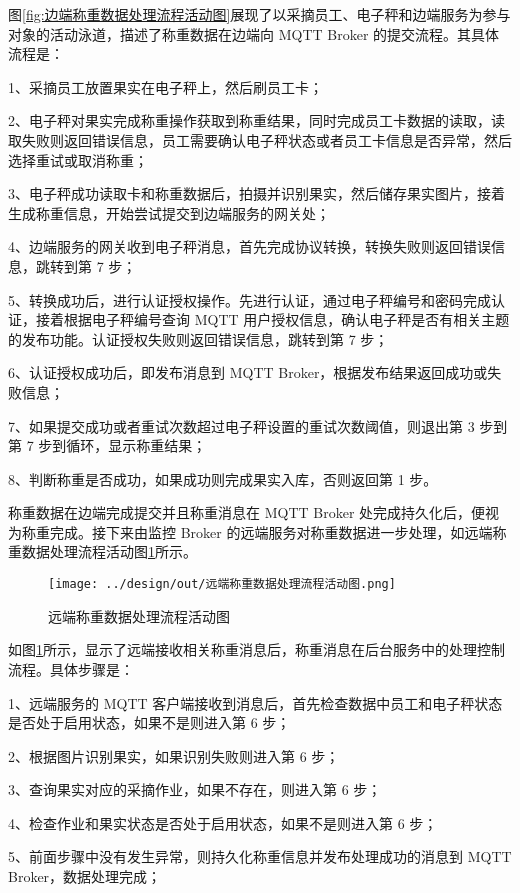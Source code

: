 图\ref{fig:边端称重数据处理流程活动图}展现了以采摘员工、电子秤和边端服务为参与对象的活动泳道，描述了称重数据在边端向 MQTT Broker 的提交流程。其具体流程是：

1、采摘员工放置果实在电子秤上，然后刷员工卡；

2、电子秤对果实完成称重操作获取到称重结果，同时完成员工卡数据的读取，读取失败则返回错误信息，员工需要确认电子秤状态或者员工卡信息是否异常，然后选择重试或取消称重；

3、电子秤成功读取卡和称重数据后，拍摄并识别果实，然后储存果实图片，接着生成称重信息，开始尝试提交到边端服务的网关处；

4、边端服务的网关收到电子秤消息，首先完成协议转换，转换失败则返回错误信息，跳转到第 7 步；

5、转换成功后，进行认证授权操作。先进行认证，通过电子秤编号和密码完成认证，接着根据电子秤编号查询 MQTT 用户授权信息，确认电子秤是否有相关主题的发布功能。认证授权失败则返回错误信息，跳转到第 7 步；

6、认证授权成功后，即发布消息到 MQTT Broker，根据发布结果返回成功或失败信息；

7、如果提交成功或者重试次数超过电子秤设置的重试次数阈值，则退出第 3 步到第 7 步到循环，显示称重结果；

8、判断称重是否成功，如果成功则完成果实入库，否则返回第 1 步。

称重数据在边端完成提交并且称重消息在 MQTT Broker 处完成持久化后，便视为称重完成。接下来由监控 Broker 的远端服务对称重数据进一步处理，如远端称重数据处理流程活动图\ref{fig:远端称重数据处理流程活动图}所示。

\begin{figure}[H]
    \centering
    \texttt{[image: ../design/out/远端称重数据处理流程活动图.png]}
    \caption{远端称重数据处理流程活动图}
    \label{fig:远端称重数据处理流程活动图}
\end{figure}

如图\ref{fig:远端称重数据处理流程活动图}所示，显示了远端接收相关称重消息后，称重消息在后台服务中的处理控制流程。具体步骤是：

1、远端服务的 MQTT 客户端接收到消息后，首先检查数据中员工和电子秤状态是否处于启用状态，如果不是则进入第 6 步；

2、根据图片识别果实，如果识别失败则进入第 6 步；

3、查询果实对应的采摘作业，如果不存在，则进入第 6 步；

4、检查作业和果实状态是否处于启用状态，如果不是则进入第 6 步；

5、前面步骤中没有发生异常，则持久化称重信息并发布处理成功的消息到 MQTT Broker，数据处理完成；

